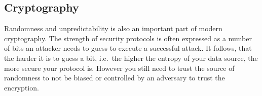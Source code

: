 \subsection{Cryptography}\label{subsec:usecase_cryptography}
Randomness and unpredictability is also an important part of modern cryptography. The strength of security protocols is often expressed as a number of bits an attacker needs to guess to execute a successful attack. It follows, that the harder it is to guess a bit, i.e.\ the higher the entropy of your data source, the more secure your protocol is. However you still need to trust the source of randomness to not be biased or controlled by an adversary to trust the encryption. 
